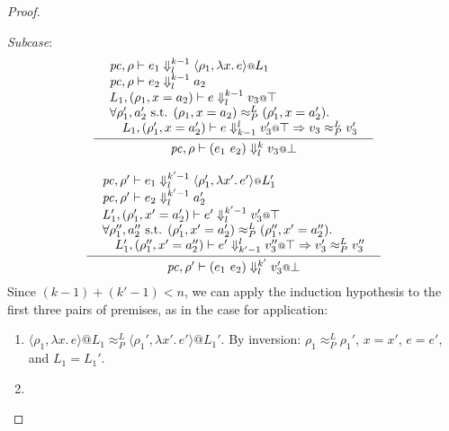 \documentclass{article}
\makeatletter
\theoremstyle{definition}
\newcommand{\at}{\ensuremath{{\scriptstyle{@}}}}
\newcommand{\pc}{\ensuremath{{\mathit{pc}}}}
\makeatother
\begin{document}
\begin{proof}
\begin{description}
    \emph{Subcase}:
    \begin{gather*}
      \inference{
        {\begin{array}{l}
            \pc, \rho |- e_1 \Downarrow^{k-1}_{l}
            \langle{\rho_1, \lambda{x}.\, e\rangle} \at L_1
            \\
            \pc, \rho |- e_2 \Downarrow^{k-1}_{l} a_2
            \\
            L_1, (\rho_1, x = a_2) |- e \Downarrow^{k-1}_{l} v_3 \at \top
            \\
            \forall{\rho_1', a_2' \text{ s.t. }
              (\rho_1, x = a_2) \approx^{L}_{P} (\rho_1', x = a_2')}.
            \\\quad
            L_1, (\rho_1', x = a_2') |- e \Downarrow^{l}_{k-1} v_3' \at \top =>
            v_3 \approx^{L}_{P} v_3'
          \end{array}}
      }{
        \pc, \rho |- (e_1\ e_2) \Downarrow^{k}_{l} v_3 \at \bot
      }
      \\[2ex]
      \inference{
        {\begin{array}{l}
            \pc, \rho' |- e_1 \Downarrow^{k'-1}_{l}
            \langle{\rho_1', \lambda{x'}.\, e'\rangle} \at L_1'
            \\
            \pc, \rho' |- e_2 \Downarrow^{k'-1}_{l} a_2'
            \\
            L_1', (\rho_1', x' = a_2') |- e' \Downarrow^{k'-1}_{l} v_3' \at \top
            \\
            \forall{\rho_1'', a_2'' \text{ s.t. }
              (\rho_1', x' = a_2') \approx^{L}_{P} (\rho_1'', x' = a_2'')}.
            \\\quad
            L_1', (\rho_1'', x' = a_2'') |- e' \Downarrow^{l}_{k'-1}
            v_3'' \at \top =>
            v_3' \approx^{L}_{P} v_3''
          \end{array}}
      }{
        \pc, \rho' |- (e_1\ e_2) \Downarrow^{k'}_{l} v_3' \at \bot
      }
    \end{gather*}
    Since $(k-1) + (k'-1) < n$, we can apply the induction hypothesis to
    the first three pairs of premises, as in the case for application:
    \begin{enumerate}
    \item 
      $\langle{\rho_1, \lambda{x}.\, e\rangle} \at L_1
      \approx^{L}_{P}
      \langle{\rho_1', \lambda{x'}.\, e'\rangle} \at L_1'$.
      By inversion:
      $\rho_1 \approx^{L}_{P} \rho_1'$,
      $x = x'$, $e = e'$, and $L_1 = L_1'$.
    \item

\end{enumerate}
\end{description}
\end{proof}
\end{document}
